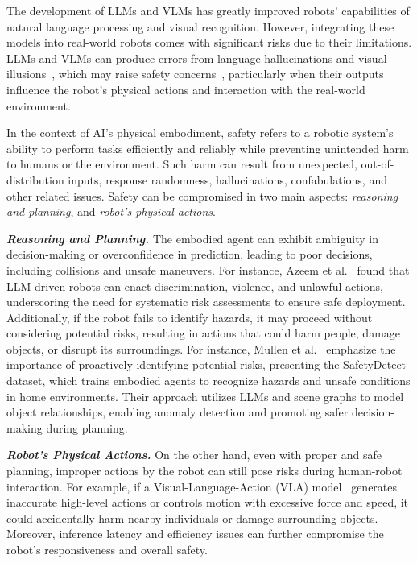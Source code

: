 The development of LLMs and VLMs has greatly improved robots' capabilities of natural language processing and visual recognition. However, integrating these models into real-world robots comes with significant risks due to their limitations. LLMs and VLMs can produce errors from language hallucinations and visual illusions~\cite{HallusionBench}, which may raise safety concerns~\cite{wu2024safety, robey2024jailbreaking}, particularly when their outputs influence the robot's physical actions and interaction with the real-world environment.

In the context of AI's physical embodiment, safety refers to a robotic system's ability to perform tasks efficiently and reliably while preventing unintended harm to humans or the environment. Such harm can result from unexpected, out-of-distribution inputs, response randomness, hallucinations, confabulations, and other related issues. Safety can be compromised in two main aspects: \textit{reasoning and planning}, and \textit{robot's physical actions}. 


\textbf{\textit{Reasoning and Planning.}} The embodied agent can exhibit ambiguity in decision-making or overconfidence in prediction, leading to poor decisions, including collisions and unsafe maneuvers. For instance, Azeem et al.~\cite{azeem2024llmdrivenrobotsriskenacting} found that LLM-driven robots can enact discrimination, violence, and unlawful actions, underscoring the need for systematic risk assessments to ensure safe deployment. Additionally, if the robot fails to identify hazards, it may proceed without considering potential risks, resulting in actions that could harm people, damage objects, or disrupt its surroundings. For instance, Mullen et al.~\cite{Mullen2024DontFT} emphasize the importance of proactively identifying potential risks, presenting the SafetyDetect dataset, which trains embodied agents to recognize hazards and unsafe conditions in home environments. Their approach utilizes LLMs and scene graphs to model object relationships, enabling anomaly detection and promoting safer decision-making during planning.

\textbf{\textit{Robot's Physical Actions.}} On the other hand, even with proper and safe planning, improper actions by the robot can still pose risks during human-robot interaction. For example, if a Visual-Language-Action (VLA) model~\cite{ma2024surveyvisionlanguageactionmodelsembodied, guruprasad2024benchmarkingvisionlanguage} generates inaccurate high-level actions or controls motion with excessive force and speed, it could accidentally harm nearby individuals or damage surrounding objects. Moreover, inference latency and efficiency issues can further compromise the robot's responsiveness and overall safety.

